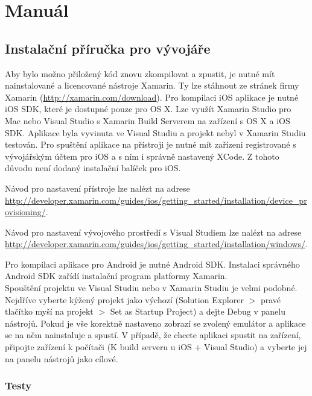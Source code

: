 \chapter{Manuál}
\label{ch:manual}
\graphicspath{{appendixes/Manual/}}

\section{Instalační příručka pro vývojáře}

Aby bylo možno přiložený kód znovu zkompilovat a zpustit, je nutné mít nainstalované a licencované nástroje Xamarin.
Ty lze stáhnout ze stránek firmy Xamarin (\url{http://xamarin.com/download}).
Pro kompilaci iOS aplikace je nutné iOS SDK, které je dostupné pouze pro OS X. 
Lze využít Xamarin Studio pro Mac nebo Visual Studio s Xamarin Build Serverem na zařízení s OS X a iOS SDK.
Aplikace byla vyvinuta ve Visual Studiu a projekt nebyl v Xamarin Studiu testován.
Pro spuštění aplikace na přístroji je nutné mít zařízeni registrované s vývojářským účtem pro iOS a s ním i správně nastavený XCode.
Z tohoto důvodu není dodaný instalační balíček pro iOS.

\begin{sloppypar}
Návod pro nastavení přístroje lze nalézt na adrese
\url{http://developer.xamarin.com/guides/ios/getting_started/installation/device_provisioning/}.

Návod pro nastavení vývojového prostředí s Visual Studiem lze nalézt na adrese \url{http://developer.xamarin.com/guides/ios/getting_started/installation/windows/}.
\end{sloppypar}

Pro kompilaci aplikace pro Android je nutné Android SDK. 
Instalaci správného Android SDK zařídí instalační program platformy Xamarin.\\

Spouštění projektu ve Visual Studiu nebo v Xamarin Studiu je velmi podobné. 
Nejdříve vyberte kýžený projekt jako výchozí (Solution Explorer $>$ pravé tlačítko myší na projekt $>$ Set as Startup Project) a dejte Debug v panelu nástrojů.
Pokud je vše korektně nastaveno zobrazí se zvolený emulátor a aplikace se na něm nainstaluje a spustí.
V případě, že chcete aplikaci spustit na zařízení, připojte zařízení k počítači (K build serveru u iOS + Visual Studio) a vyberte jej na panelu nástrojů jako cílové.

\subsection{Testy}

